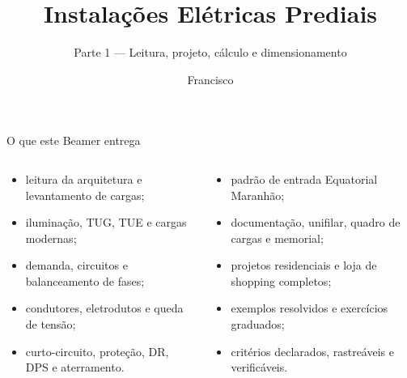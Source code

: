 \documentclass[11pt,aspectratio=169]{beamer}
\title{Instalações Elétricas Prediais}
\subtitle{Parte 1 — Leitura, projeto, cálculo e dimensionamento}
\author{Francisco}
\institute{Do levantamento arquitetônico ao projeto executivo}
\date{}
\begin{document}
{
\begin{frame}\titlepage\end{frame}}

\begin{frame}{O que este Beamer entrega}
\small
\begin{columns}[T,onlytextwidth]
\begin{caixaProjeto}[title=Projeto e cálculo]
\begin{itemize}
\item leitura da arquitetura e levantamento de cargas;
\item iluminação, TUG, TUE e cargas modernas;
\item demanda, circuitos e balanceamento de fases;
\item condutores, eletrodutos e queda de tensão;
\item curto-circuito, proteção, DR, DPS e aterramento.
\end{itemize}
\end{caixaProjeto}
\begin{caixaNorma}[title=Da entrada à entrega]
\begin{itemize}
\item padrão de entrada Equatorial Maranhão;
\item documentação, unifilar, quadro de cargas e memorial;
\item projetos residenciais e loja de shopping completos;
\item exemplos resolvidos e exercícios graduados;
\item critérios declarados, rastreáveis e verificáveis.
\end{itemize}
\end{caixaNorma}
\end{columns}
\end{frame}
























\end{document}
